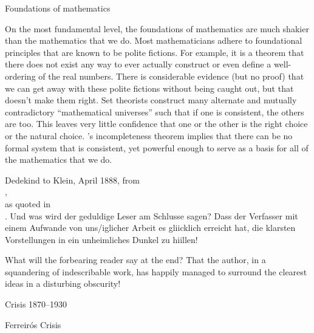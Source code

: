 \begin{plSection}{Foundations of mathematics}
\label{sec:Foundations_of_mathematics}

\begin{plQuote}
{}
{}
On the most fundamental level, the foundations of mathematics are much shakier
than the mathematics that we do. Most mathematicians adhere to foundational
principles that are known to be polite fictions. For example, it is a theorem that
there does not exist any way to ever actually construct or even define a well-ordering
of the real numbers. There is considerable evidence (but no proof) that we can get
away with these polite fictions without being caught out, but that doesn’t make
them right. Set theorists construct many alternate and mutually contradictory
``mathematical universes'' such that if one is consistent, the others are too. This
leaves very little confidence that one or the other is the right choice or the natural
choice. {\Godel}’s incompleteness theorem implies that there can be no formal system
that is consistent, yet powerful enough to serve as a basis for all of the mathematics
that we do.
\end{plQuote}

\begin{plQuote}
{Dedekind to Klein, April 1888, 
from \\
,\\
as quoted in \\
.}
{}
{Und was wird der geduldige Leser am
Schlusse sagen? Dass der Verfasser mit einem Aufwande von uns/iglicher Arbeit es gliicklich
erreicht hat, die klarsten Vorstellungen in ein unheimliches Dunkel zu hiillen!}
\par
What will the forbearing reader say at the end? That the author,
 in a squandering of indescribable work, 
 has happily managed to surround 
the clearest ideas in a disturbing obscurity!
\end{plQuote}

\begin{plSection}{Crisis 1870--1930}
\label{sec:Crisis-1870--1930}
\begin{plSection}{Ferreir\'{o}s Crisis}
\label{sec:Ferreiros_Crisis}


\end{plSection}
\end{plSection}
\end{plSection}
